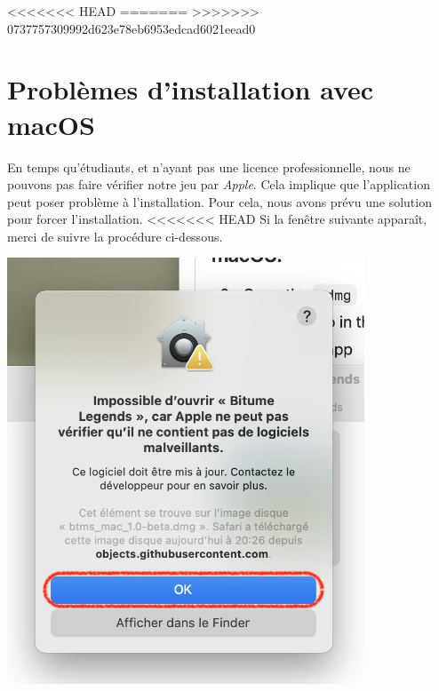 \documentclass[a4paper,12pt]{article}
\begin{document}
<<<<<<< HEAD
    \clearpage
=======
>>>>>>> 0737757309992d623e78eb6953edcad6021eead0
    \section{Problèmes d'installation avec macOS}
        En temps qu'étudiants, et n'ayant pas une licence professionnelle, nous ne pouvons 
        pas faire vérifier notre jeu par \textsl{Apple}.
        Cela implique que l'application peut poser problème à l'installation.
        Pour cela, nous avons prévu une solution pour forcer l'installation.
<<<<<<< HEAD
        Si la fenêtre suivante apparaît, merci de suivre la procédure ci-dessous.

        \begin{center}
            \includegraphics[scale=0.4]{install_mac_error.png}
        \end{center}
    
\end{document}
